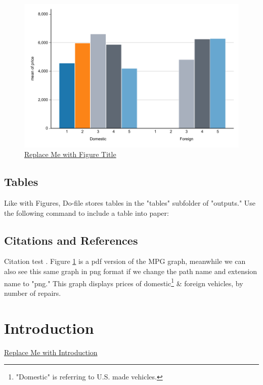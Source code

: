 \documentclass[12pt]{article}
\begin{document}
\begin{figure}[ht]
\centering
\caption{\underline{Replace Me with Figure Title}}
\label{fig:Replace_Me_with_Ref_Label}
\includegraphics[width=1\textwidth]{outputs/figures/pdf/project_name_figure_name.pdf}
\end{figure}

\subsection{Tables}

Like with Figures, Do-file stores tables in the "tables" subfolder of "outputs." Use the following command to include a table into paper:



\subsection{Citations and References}

Citation test \parencite{keefer2022demand}. Figure \ref{fig:Replace_Me_with_Ref_Label} is a pdf version of the MPG graph, meanwhile we can also see this same graph in png format if we change the path name and extension name to "png." This graph displays prices of domestic\footnote{"Domestic" is referring to U.S. made vehicles.\label{fnote:domestic}} 
\& foreign vehicles, by number of repairs.

\section{Introduction}

\underline{Replace Me with Introduction}


\printbibliography 
\end{document}

